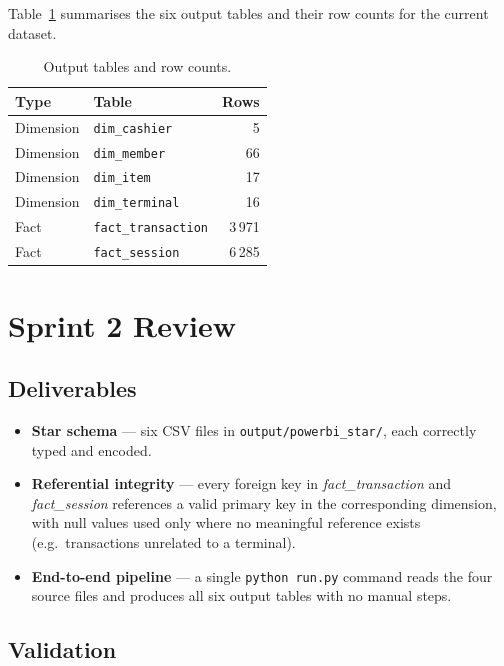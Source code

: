 Table~\ref{tab:output_tables} summarises the six output tables and their row counts
for the current dataset.

\begin{table}[H]
  \centering
  \caption{Output tables and row counts.\label{tab:output_tables}}
  \begin{tabular}{llr}
    \toprule
    \textbf{Type} & \textbf{Table} & \textbf{Rows} \\
    \midrule
    Dimension & \texttt{dim\_cashier}    &   5 \\
    Dimension & \texttt{dim\_member}     &  66 \\
    Dimension & \texttt{dim\_item}       &  17 \\
    Dimension & \texttt{dim\_terminal}   &  16 \\
    Fact      & \texttt{fact\_transaction} & 3\,971 \\
    Fact      & \texttt{fact\_session}   & 6\,285 \\
    \bottomrule
  \end{tabular}
\end{table}

\section{Sprint 2 Review}

\subsection{Deliverables}

\begin{itemize}
  \item \textbf{Star schema} — six CSV files in \texttt{output/powerbi\_star/},
        each correctly typed and encoded.
  \item \textbf{Referential integrity} — every foreign key in \textit{fact\_transaction}
        and \textit{fact\_session} references a valid primary key in the corresponding
        dimension, with null values used only where no meaningful reference exists
        (e.g.\ transactions unrelated to a terminal).
  \item \textbf{End-to-end pipeline} — a single \texttt{python run.py} command
        reads the four source files and produces all six output tables with no
        manual steps.
\end{itemize}

\subsection{Validation}

